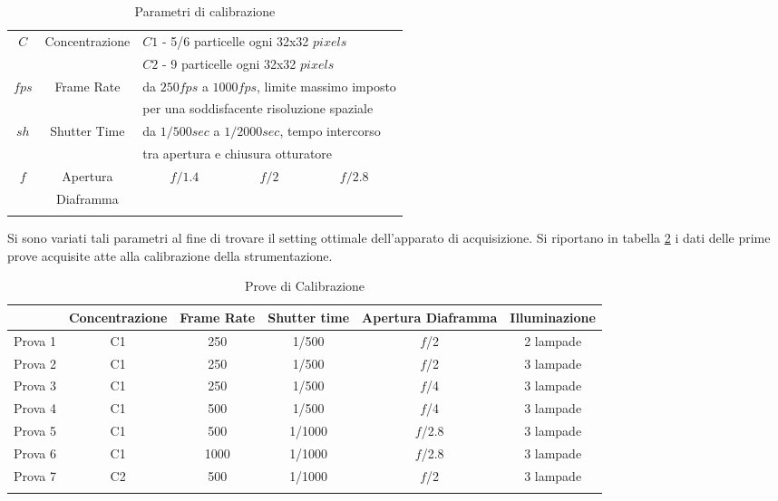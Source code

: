 \documentclass{article} %
\begin{document}
\clearpage
\begin{longtable}{|c|c|c|c|c|}
	\hline
	\multicolumn{1}{|c|}{$C$}  & \multicolumn{1}{|c|}{Concentrazione} & \multicolumn{3}{|l|}{$C1$ - 5/6 particelle ogni 32x32 $pixels$} \\
	\multicolumn{1}{|c|}{}  & \multicolumn{1}{|c|}{} & \multicolumn{3}{|l|}{$C2$ - 9 particelle ogni 32x32 $pixels$} \\
	\hline
	\multicolumn{1}{|c|}{$fps$}  & \multicolumn{1}{|c|}{Frame Rate} & \multicolumn{3}{|l|}{da $250fps$ a $1000fps$, limite massimo imposto} \\
	\multicolumn{1}{|c|}{}  & \multicolumn{1}{|c|}{} & \multicolumn{3}{|l|}{per una soddisfacente risoluzione
		spaziale} \\
	\hline
	\multicolumn{1}{|c|}{$sh$}  & \multicolumn{1}{|c|}{Shutter Time} & \multicolumn{3}{|l|}{da $1/500sec$ a $1/2000sec$, tempo intercorso } \\
	\multicolumn{1}{|c|}{}  & \multicolumn{1}{|c|}{} & \multicolumn{3}{|l|}{tra apertura e chiusura otturatore} \\
	\hline
	\multicolumn{1}{|c|}{$f$}  & \multicolumn{1}{|c|}{Apertura} & \multicolumn{1}{|c|}{$f/1.4$} & \multicolumn{1}{|c|}{$f/2$} & \multicolumn{1}{|c|}{$f/2.8$} \\
	\multicolumn{1}{|c|}{}  & \multicolumn{1}{|c|}{Diaframma} & \multicolumn{1}{|c|}{}& \multicolumn{1}{|c|}{}& \multicolumn{1}{|c|}{}\\
	\hline
	\caption{Parametri di calibrazione}
	\label{tab:parametri}
\end{longtable}
Si sono variati tali parametri al fine di trovare il setting ottimale dell'apparato di acquisizione. Si riportano in tabella \ref{tab:calibrazione} i dati delle prime prove acquisite atte alla calibrazione della strumentazione.
\begin{longtable}{|l|c|c|c|c|c|}
	\hline
	\multicolumn{1}{|c|}{}
	& \multicolumn{1}{|c|}{Concentrazione}
	& \multicolumn{1}{|c|}{Frame Rate}
	& \multicolumn{1}{|c|}{Shutter time}
	& \multicolumn{1}{|c|}{Apertura Diaframma}
	& \multicolumn{1}{|c|}{Illuminazione}
	\\
	\hline
	Prova 1      &  C1  & 250 & 1/500 & $f$/2 & 2 lampade\\
	\hline
	Prova 2      &  C1 & 250 & 1/500 & $f$/2 & 3 lampade\\
	\hline
	Prova 3      &  C1 & 250 & 1/500 & $f$/4 & 3 lampade\\
	\hline
	Prova 4      &  C1 & 500 & 1/500&$f$/4 & 3 lampade\\
	\hline
	Prova 5      &   C1 & 500 & 1/1000&$f$/2.8 & 3 lampade\\
	\hline
	Prova 6      & C1   & 1000 &1/1000 &$f$/2.8 & 3 lampade\\
	\hline
	Prova 7      & C2  & 500 &1/1000 &$f$/2 & 3 lampade\\
	\hline
	\caption{Prove di Calibrazione}
	\label{tab:calibrazione}
\end{longtable}
\end{document}
